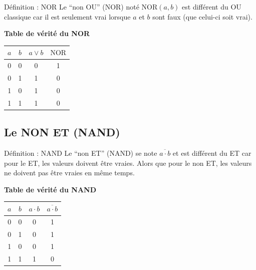 \documentclass[a4paper,12pt]{article}
\begin{document}
\begin{defbox}{Définition : NOR}
Le ``non OU'' (NOR) noté $\text{NOR}(a,b)$ est différent du OU classique car il est seulement vrai lorsque $a$ et $b$ sont faux (que celui-ci soit vrai).
\end{defbox}

\vspace{0.5cm}

\begin{center}
\textbf{Table de vérité du NOR}
\vspace{0.3cm}

\begin{tabular}{|c|c|c|c|}
\hline
$a$ & $b$ & $a \vee b$ & $\text{NOR}$ \\
\hline
0 & 0 & 0 & 1 \\
\hline
0 & 1 & 1 & 0 \\
\hline
1 & 0 & 1 & 0 \\
\hline
1 & 1 & 1 & 0 \\
\hline
\end{tabular}
\end{center}

\subsection{Le NON ET (NAND)}

\begin{defbox}{Définition : NAND}
Le ``non ET'' (NAND) se note $\overline{a \cdot b}$ et est différent du ET car pour le ET, les valeurs doivent être vraies. Alors que pour le non ET, les valeurs ne doivent pas être vraies en même temps.
\end{defbox}

\vspace{0.5cm}

\begin{center}
\textbf{Table de vérité du NAND}
\vspace{0.3cm}

\begin{tabular}{|c|c|c|c|}
\hline
$a$ & $b$ & $a \cdot b$ & $\overline{a \cdot b}$ \\
\hline
0 & 0 & 0 & 1 \\
\hline
0 & 1 & 0 & 1 \\
\hline
1 & 0 & 0 & 1 \\
\hline
1 & 1 & 1 & 0 \\
\hline
\end{tabular}
\end{center}
\end{document}
